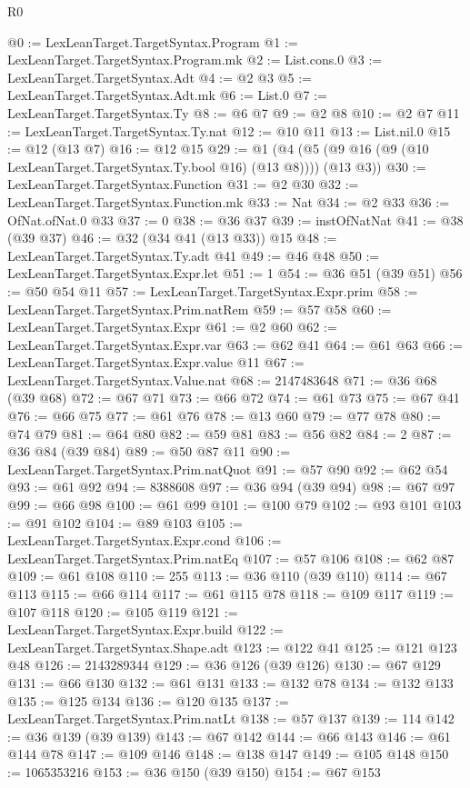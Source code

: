 \begin{lexlean}{R0}
\begin{coremodule}
@0 := LexLeanTarget.TargetSyntax.Program
@1 := LexLeanTarget.TargetSyntax.Program.mk
@2 := List.cons.{0}
@3 := LexLeanTarget.TargetSyntax.Adt
@4 := @2 @3
@5 := LexLeanTarget.TargetSyntax.Adt.mk
@6 := List.{0}
@7 := LexLeanTarget.TargetSyntax.Ty
@8 := @6 @7
@9 := @2 @8
@10 := @2 @7
@11 := LexLeanTarget.TargetSyntax.Ty.nat
@12 := @10 @11
@13 := List.nil.{0}
@15 := @12 (@13 @7)
@16 := @12 @15
@29 := @1 (@4 (@5 (@9 @16 (@9 (@10 LexLeanTarget.TargetSyntax.Ty.bool @16) (@13 @8)))) (@13 @3))
@30 := LexLeanTarget.TargetSyntax.Function
@31 := @2 @30
@32 := LexLeanTarget.TargetSyntax.Function.mk
@33 := Nat
@34 := @2 @33
@36 := OfNat.ofNat.{0} @33
@37 := 0
@38 := @36 @37
@39 := instOfNatNat
@41 := @38 (@39 @37)
@46 := @32 (@34 @41 (@13 @33)) @15
@48 := LexLeanTarget.TargetSyntax.Ty.adt @41
@49 := @46 @48
@50 := LexLeanTarget.TargetSyntax.Expr.let
@51 := 1
@54 := @36 @51 (@39 @51)
@56 := @50 @54 @11
@57 := LexLeanTarget.TargetSyntax.Expr.prim
@58 := LexLeanTarget.TargetSyntax.Prim.natRem
@59 := @57 @58
@60 := LexLeanTarget.TargetSyntax.Expr
@61 := @2 @60
@62 := LexLeanTarget.TargetSyntax.Expr.var
@63 := @62 @41
@64 := @61 @63
@66 := LexLeanTarget.TargetSyntax.Expr.value @11
@67 := LexLeanTarget.TargetSyntax.Value.nat
@68 := 2147483648
@71 := @36 @68 (@39 @68)
@72 := @67 @71
@73 := @66 @72
@74 := @61 @73
@75 := @67 @41
@76 := @66 @75
@77 := @61 @76
@78 := @13 @60
@79 := @77 @78
@80 := @74 @79
@81 := @64 @80
@82 := @59 @81
@83 := @56 @82
@84 := 2
@87 := @36 @84 (@39 @84)
@89 := @50 @87 @11
@90 := LexLeanTarget.TargetSyntax.Prim.natQuot
@91 := @57 @90
@92 := @62 @54
@93 := @61 @92
@94 := 8388608
@97 := @36 @94 (@39 @94)
@98 := @67 @97
@99 := @66 @98
@100 := @61 @99
@101 := @100 @79
@102 := @93 @101
@103 := @91 @102
@104 := @89 @103
@105 := LexLeanTarget.TargetSyntax.Expr.cond
@106 := LexLeanTarget.TargetSyntax.Prim.natEq
@107 := @57 @106
@108 := @62 @87
@109 := @61 @108
@110 := 255
@113 := @36 @110 (@39 @110)
@114 := @67 @113
@115 := @66 @114
@117 := @61 @115 @78
@118 := @109 @117
@119 := @107 @118
@120 := @105 @119
@121 := LexLeanTarget.TargetSyntax.Expr.build
@122 := LexLeanTarget.TargetSyntax.Shape.adt
@123 := @122 @41
@125 := @121 @123 @48
@126 := 2143289344
@129 := @36 @126 (@39 @126)
@130 := @67 @129
@131 := @66 @130
@132 := @61 @131
@133 := @132 @78
@134 := @132 @133
@135 := @125 @134
@136 := @120 @135
@137 := LexLeanTarget.TargetSyntax.Prim.natLt
@138 := @57 @137
@139 := 114
@142 := @36 @139 (@39 @139)
@143 := @67 @142
@144 := @66 @143
@146 := @61 @144 @78
@147 := @109 @146
@148 := @138 @147
@149 := @105 @148
@150 := 1065353216
@153 := @36 @150 (@39 @150)
@154 := @67 @153

\end{coremodule}
\end{lexlean}
